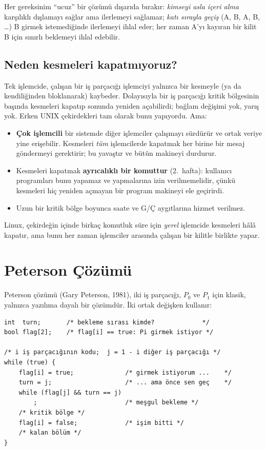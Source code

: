 \documentclass[11pt,a4paper]{article}
\begin{document}
Her gereksinim ``ucuz'' bir çözümü dışarıda bırakır: \emph{kimseyi asla içeri alma} karşılıklı dışlamayı sağlar ama ilerlemeyi sağlamaz; \emph{katı sırayla geçiş} (A, B, A, B, \dots) B girmek istemediğinde ilerlemeyi ihlal eder; her zaman A'yı kayıran bir kilit B için sınırlı beklemeyi ihlal edebilir.

\subsection{Neden kesmeleri kapatmıyoruz?}

Tek işlemcide, çalışan bir iş parçacığı işlemciyi yalnızca bir kesmeyle (ya da kendiliğinden bloklanarak) kaybeder. Dolayısıyla bir iş parçacığı kritik bölgesinin başında kesmeleri kapatıp sonunda yeniden açabilirdi; bağlam değişimi yok, yarış yok. Erken UNIX çekirdekleri tam olarak bunu yapıyordu. Ama:
\begin{itemize}
  \item \textbf{Çok işlemcili} bir sistemde diğer işlemciler çalışmayı sürdürür ve ortak veriye yine erişebilir. Kesmeleri \emph{tüm} işlemcilerde kapatmak her birine bir mesaj göndermeyi gerektirir; bu yavaştır ve bütün makineyi durdurur.
  \item Kesmeleri kapatmak \textbf{ayrıcalıklı bir komuttur} (2.~hafta): kullanıcı programları bunu yapamaz ve yapmalarına izin verilmemelidir, çünkü kesmeleri hiç yeniden açmayan bir program makineyi ele geçirirdi.
  \item Uzun bir kritik bölge boyunca saate ve G/Ç aygıtlarına hizmet verilmez.
\end{itemize}
Linux, çekirdeğin içinde birkaç komutluk süre için \emph{yerel} işlemcide kesmeleri hâlâ kapatır, ama bunu her zaman işlemciler arasında çalışan bir kilitle birlikte yapar.

\section{Peterson Çözümü}

Peterson çözümü (Gary Peterson, 1981), iki iş parçacığı, $P_0$ ve $P_1$ için klasik, yalnızca yazılıma dayalı bir çözümdür. İki ortak değişken kullanır:
\begin{lstlisting}
int  turn;       /* bekleme sırası kimde?             */
bool flag[2];    /* flag[i] == true: Pi girmek istiyor */

/* i iş parçacığının kodu;  j = 1 - i diğer iş parçacığı */
while (true) {
    flag[i] = true;              /* girmek istiyorum ...    */
    turn = j;                    /* ... ama önce sen geç    */
    while (flag[j] && turn == j)
        ;                        /* meşgul bekleme */
    /* kritik bölge */
    flag[i] = false;             /* işim bitti */
    /* kalan bölüm */
}
\end{lstlisting}
\end{document}
